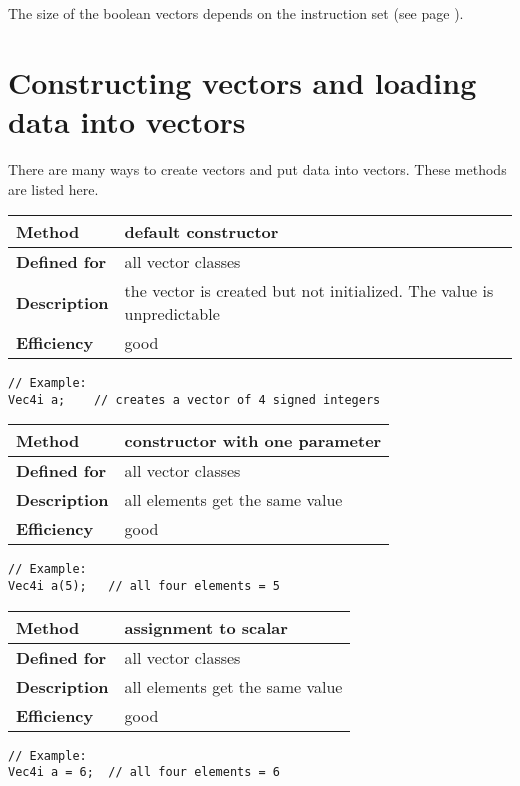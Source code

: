 \documentclass[vcl_manual.tex]{subfiles}
\begin{document}
The size of the boolean vectors depends on the instruction set (see page \pageref{tableBooleanVectorSizes}).


\section{Constructing vectors and loading data into vectors} \label{ConstructingVectors}

There are many ways to create vectors and put data into vectors. These methods are listed here.

\begin{tabular}{|p{25mm}|p{100mm}|}
\hline
\bfseries Method & default constructor \\ \hline
\bfseries Defined for & all vector classes \\ \hline
\bfseries Description & the vector is created but not initialized. The value is unpredictable \\ \hline
\bfseries Efficiency & good \\ \hline
\end{tabular}

\begin{lstlisting}[frame=none]
// Example:
Vec4i a;    // creates a vector of 4 signed integers
\end{lstlisting}

\begin{tabular}[l]{|p{25mm}|p{100mm}|}
\hline
\bfseries Method & constructor with one parameter \\ \hline
\bfseries Defined for & all vector classes \\ \hline
\bfseries Description & all elements get the same value \\ \hline
\bfseries Efficiency & good \\ \hline
\end{tabular}
\begin{lstlisting}[frame=none]
// Example:
Vec4i a(5);   // all four elements = 5
\end{lstlisting}

\begin{tabular}{|p{25mm}|p{100mm}|}
\hline
\bfseries Method & assignment to scalar \\ \hline
\bfseries Defined for & all vector classes \\ \hline
\bfseries Description & all elements get the same value \\ \hline
\bfseries Efficiency & good \\ \hline
\end{tabular}
\begin{lstlisting}[frame=none]
// Example:
Vec4i a = 6;  // all four elements = 6
\end{lstlisting}
\end{document}
